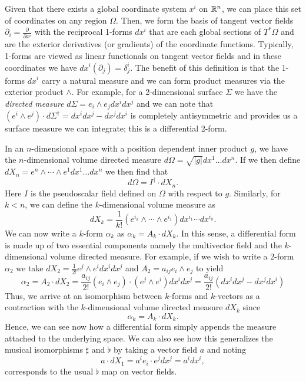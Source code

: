 Given that there exists a global coordinate system $x^i$ on $\mathbb{R}^n$, we can place this set of coordinates on any region $\Omega$. Then, we form the basis of tangent vector fields $\partial_i = \frac{\partial}{\partial x^i}$ with the reciprocal 1-forms $dx^i$ that are each global sections of $T^*\Omega$ and are the exterior derivatives (or gradients) of the coordinate functions.  Typically, 1-forms are viewed as linear functionals on tangent vector fields and in these coordinates we have $dx^i  (\partial_j) = \delta^i_j$.  The benefit of this definition is that the 1-forms $dx^i$ carry a natural measure and we can form product measures via the exterior product $\wedge$.  For example, for a 2-dimensional surface $\Sigma$ we have the \emph{directed measure} $d\Sigma = e_i \wedge e_j dx^i dx^j$ and we can note that $(e^i \wedge e^j)\cdot d\Sigma^\dagger = dx^idx^j - dx^j dx^i$ is completely antisymmetric and provides us a surface measure we can integrate; this is a differential 2-form.

In an $n$-dimensional space with a position dependent inner product $g$, we have the $n$-dimensional volume directed measure $d\Omega = \sqrt{|g|} dx^1\dots dx^n$. If we then define $dX_n = e^n \wedge \cdots \wedge e^1 dx^1 \dots dx^n$ we then find that
\[
d\Omega = I^\dagger \cdot dX_n.
\]
Here $I$ is the pseudoscalar field defined on $\Omega$ with respect to $g$. Similarly, for $k<n$, we can define the $k$-dimensional volume measure as 
\[
dX_k = \frac{1}{k!}(e^{i_k}\wedge \cdots \wedge e^{i_1}) dx^{i_1} \cdots dx^{i_k}.
\]
We can now write a $k$-form $\alpha_k$ as $\alpha_k = A_k \cdot dX_k$. In this sense, a differential form is made up of two essential components namely the multivector field and the $k$-dimensional volume directed measure. For example, if we wish to write a 2-form $\alpha_2$ we take $dX_2 = \frac{1}{2!} e^j \wedge e^i dx^i dx^j$ and $A_2 = a_{ij} e_i \wedge e_j$ to yield
\[
\alpha_2 = A_2 \cdot dX_2 = \frac{a_{ij}}{2!} (e_i \wedge e_j) \cdot (e^j \wedge e^i) dx^i dx^j = \frac{a_{ij}}{2!} (dx^i dx^j - dx^j dx^i)
\]
Thus, we arrive at an isomorphism between $k$-forms and $k$-vectors as a contraction with the $k$-dimensional volume directed measure $dX_k$ since
\[
\alpha_k = A_k \cdot dX_k.
\]
Hence, we can see now how a differential form simply appends the measure attached to the underlying space. We can also see how this generalizes the musical isomorphisms $\sharp$ and $\flat$ by taking a vector field $a$ and noting
\begin{equation}
\label{eq:line_element}
a \cdot dX_1 = a^i e_i \cdot e^j dx^j = a^i dx^i,
\end{equation}
corresponds to the usual $\flat$ map on vector fields.

